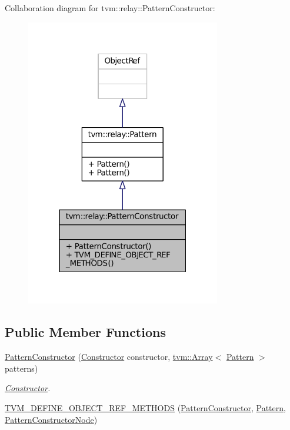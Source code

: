 Collaboration diagram for tvm\+:\+:relay\+:\+:Pattern\+Constructor\+:
\nopagebreak
\begin{figure}[H]
\begin{center}
\leavevmode
\includegraphics[width=241pt]{classtvm_1_1relay_1_1PatternConstructor__coll__graph}
\end{center}
\end{figure}
\subsection*{Public Member Functions}
\begin{DoxyCompactItemize}
\item 
\hyperlink{classtvm_1_1relay_1_1PatternConstructor_a96adb22c131d7bac1e54a7b646116143}{Pattern\+Constructor} (\hyperlink{namespacetvm_1_1relay_aec85bf097deda59bd22e88475c9165e9}{Constructor} constructor, \hyperlink{classtvm_1_1Array}{tvm\+::\+Array}$<$ \hyperlink{classtvm_1_1relay_1_1Pattern}{Pattern} $>$ patterns)
\begin{DoxyCompactList}\small\item\em \hyperlink{classtvm_1_1Constructor}{Constructor}. \end{DoxyCompactList}\item 
\hyperlink{classtvm_1_1relay_1_1PatternConstructor_abb2dacbcf5d314a6f5c61b4beca99a43}{T\+V\+M\+\_\+\+D\+E\+F\+I\+N\+E\+\_\+\+O\+B\+J\+E\+C\+T\+\_\+\+R\+E\+F\+\_\+\+M\+E\+T\+H\+O\+DS} (\hyperlink{classtvm_1_1relay_1_1PatternConstructor}{Pattern\+Constructor}, \hyperlink{classtvm_1_1relay_1_1Pattern}{Pattern}, \hyperlink{classtvm_1_1relay_1_1PatternConstructorNode}{Pattern\+Constructor\+Node})
\end{DoxyCompactItemize}
